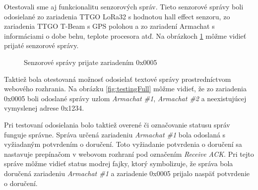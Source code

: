 \documentclass[slovak,master]{diploma}
\begin{document}
Otestovali sme aj funkcionalitu senzorových správ. Tieto senzorové správy boli odosielané zo zariadenia TTGO LoRa32 s hodnotou hall effect senzoru, 
zo zariadenia TTGO T-Beam s GPS polohou a zo zariadení Armachat s informáciami o dobe behu, teplote procesora atď. 
Na obrázkoch \ref{fig:testingSensors} môžme vidieť prijaté senzorové správy.
\begin{figure}[h!]
  \centering
  \caption{Senzorové správy prijate zariadením 0x0005}
  \label{fig:testingSensors}
\end{figure}

Taktiež bola otestovaná možnosť odosielať textové správy prostredníctvom webového rozhrania. Na obrázku \ref{fig:testingFull} môžme vidieť, 
že zo zariadenia 0x0005 boli odoslané správy uzlom \emph{Armachat \#1}, \emph{Armachat \#2} a neexistujúcej vymyslenej adrese 0x1234. 

Pri testovaní odosielania bolo taktiež overené či označovanie statusu správ funguje správne. Správa určená zariadeniu \emph{Armachat \#1} bola 
odoslaná s vyžiadaným potvrdením o doručení. Toto vyžiadanie potvrdenia o doručení sa nastavuje prepínačom v webovom rozhraní pod označením \emph{Receive ACK}.
Pri tejto správe môžme vidieť status modrej fajky, ktorý symbolizuje, že správa bola doručená zariadeniu \emph{Armachat \#1} a zariadenie 0x0005 
prijalo naspäť potvrdenie o doručení. 
\end{document}
